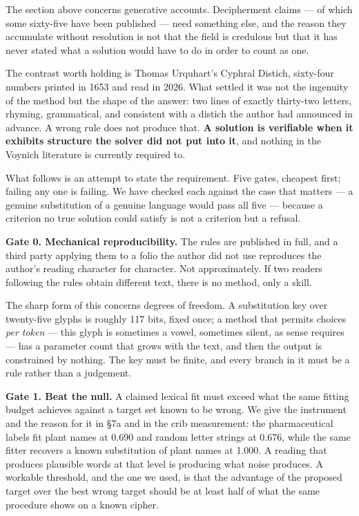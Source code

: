 \documentclass[11pt,a4paper]{article}
\begin{document}
The section above concerns generative accounts. Decipherment claims --- of which some sixty-five have been published --- need something else, and the reason they accumulate without resolution is not that the field is credulous but that it has never stated what a solution would have to do in order to count as one.


The contrast worth holding is Thomas Urquhart's Cyphral Distich, sixty-four numbers printed in 1653 and read in 2026. What settled it was not the ingenuity of the method but the shape of the answer: two lines of exactly thirty-two letters, rhyming, grammatical, and consistent with a distich the author had announced in advance. A wrong rule does not produce that. \textbf{A solution is verifiable when it exhibits structure the solver did not put into it}, and nothing in the Voynich literature is currently required to.


What follows is an attempt to state the requirement. Five gates, cheapest first; failing any one is failing. We have checked each against the case that matters --- a genuine substitution of a genuine language would pass all five --- because a criterion no true solution could satisfy is not a criterion but a refusal.


\textbf{Gate 0. Mechanical reproducibility.} The rules are published in full, and a third party applying them to a folio the author did not use reproduces the author's reading character for character. Not approximately. If two readers following the rules obtain different text, there is no method, only a skill.


The sharp form of this concerns degrees of freedom. A substitution key over twenty-five glyphs is roughly 117 bits, fixed once; a method that permits choices \emph{per token} --- this glyph is sometimes a vowel, sometimes silent, as sense requires --- has a parameter count that grows with the text, and then the output is constrained by nothing. The key must be finite, and every branch in it must be a rule rather than a judgement.


\textbf{Gate 1. Beat the null.} A claimed lexical fit must exceed what the same fitting budget achieves against a target set known to be wrong. We give the instrument and the reason for it in \S7a and in the crib measurement: the pharmaceutical labels fit plant names at 0.690 and random letter strings at 0.676, while the same fitter recovers a known substitution of plant names at 1.000. A reading that produces plausible words at that level is producing what noise produces. A workable threshold, and the one we used, is that the advantage of the proposed target over the best wrong target should be at least half of what the same procedure shows on a known cipher.
\end{document}
